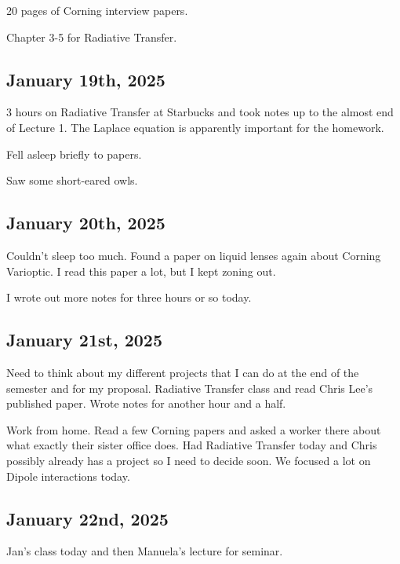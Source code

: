 \documentclass{article}
\begin{document}


20 pages of Corning interview papers. 

Chapter 3-5 for Radiative Transfer. 

\subsection{January 19th, 2025}
3 hours on Radiative Transfer at Starbucks and took notes up to the almost end of Lecture 1. The Laplace equation is apparently important for the homework. 

Fell asleep briefly to papers. 

Saw some short-eared owls. 

\subsection{January 20th, 2025}
Couldn't sleep too much. Found a paper on liquid lenses again about Corning Varioptic. I read this paper a lot, but I kept zoning out. 

I wrote out more notes for three hours or so today. 


\subsection{January 21st, 2025}
Need to think about my different projects that I can do at the end of the semester and for my proposal. Radiative Transfer class and read Chris Lee's published paper. Wrote notes for another hour and a half. 


Work from home. Read a few Corning papers and asked a worker there about what exactly their sister office does. Had Radiative Transfer today and Chris possibly already has a project so I need to decide soon. We focused a lot on Dipole interactions today. 

\subsection{January 22nd, 2025}
Jan's class today and then Manuela's lecture for seminar. 





\end{document}
